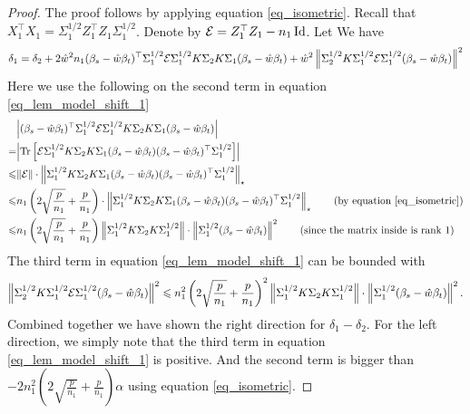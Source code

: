 \begin{proof}
	The proof follows by applying equation \eqref{eq_isometric}.
	Recall that $X_1^{\top}X_1 = \Sigma_1^{1/2}Z_1^{\top}Z_1\Sigma_1^{1/2}$.
	Denote by $\mathcal{E} = Z_1^{\top}Z_1 - {n_1}\operatorname{Id}$.
	Let
	We have
	\begin{align}
		\delta_1 = \delta_2 + {2\hat{w}^2n_1}(\beta_s - \hat{w}\beta_t)^{\top}\Sigma_1^{1/2}\mathcal{E}\Sigma_1^{1/2}K \Sigma_2 K \Sigma_1 (\beta_s - \hat{w}\beta_t)
		+ \hat{w}^2\left\| \Sigma_2^{1/2} K \Sigma_1^{1/2}\mathcal{E} \Sigma_1^{1/2}(\beta_s - \hat{w}\beta_t) \right\|^2 \label{eq_lem_model_shift_1}
	\end{align}
	Here we use the following on the second term in equation \eqref{eq_lem_model_shift_1}
	\begin{align*}
		& \bigabs{(\beta_s - \hat{w}\beta_t)^{\top} \Sigma_1^{1/2} \cE \Sigma_1^{1/2} K \Sigma_2 K \Sigma_1 (\beta_s - \hat{w}\beta_t)} \\
		= & \bigabs{\bigtr{\cE \Sigma_1^{1/2}K\Sigma_2 K \Sigma_1(\beta_s - \hat{w}\beta_t)(\beta_s - \hat{w}\beta_t)^{\top} \Sigma_1^{1/2}}} \\
		\le & \norm{\cE} \cdot \bignormNuclear{\Sigma_1^{1/2} K \Sigma_2 K \Sigma_1 (\beta_s - \hat{w}\beta_t) (\beta_s - \hat{w}\beta_t)^{\top} \Sigma_1^{1/2}} \\
		\le & n_1 \bigbrace{2\sqrt{\frac{p}{n_1}} + \frac{p}{n_1}} \cdot \bignormNuclear{\Sigma_1^{1/2} K \Sigma_2 K \Sigma_1 (\beta_s - \hat{w}\beta_t)(\beta_s - \hat{w}\beta_t)^{\top} \Sigma_1^{1/2}} \tag{by equation \eqref{eq_isometric}} \\
		\le   & n_1 \bigbrace{2\sqrt{\frac{p}{n_1}} + \frac{p}{n_1}} \bignorm{\Sigma_1^{1/2}K \Sigma_2 K \Sigma_1^{1/2}} \cdot \bignorm{\Sigma_1^{1/2}(\beta_s - \hat{w}\beta_t)}^2 \tag{since the matrix inside is rank 1}
	\end{align*}
	The third term in equation \eqref{eq_lem_model_shift_1} can be bounded with
	\begin{align*}
		\left\| \Sigma_2^{1/2}K\Sigma_1^{1/2}\mathcal{E}\Sigma_1^{1/2}(\beta_s - \hat{w}\beta_t) \right\|^2
		\leqslant n_1^2 \left({2\sqrt{\frac{p}{n_1}} + \frac{p}{n_1}}\right)^2 \left\| \Sigma_1^{1/2}K\Sigma_{2}K\Sigma_1^{1/2} \right\| \cdot \left\| \Sigma_1^{1/2}(\beta_s - \hat{w}\beta_t) \right\|^2.
	\end{align*}
	Combined together we have shown the right direction for $\delta_1 - \delta_2$.
	For the left direction, we simply note that the third term in equation \eqref{eq_lem_model_shift_1} is positive.
	And the second term is bigger than $-2n_1^2(2\sqrt{\frac{p}{n_1}} + \frac{p}{n_1}) \alpha$ using equation \eqref{eq_isometric}.
\end{proof}




